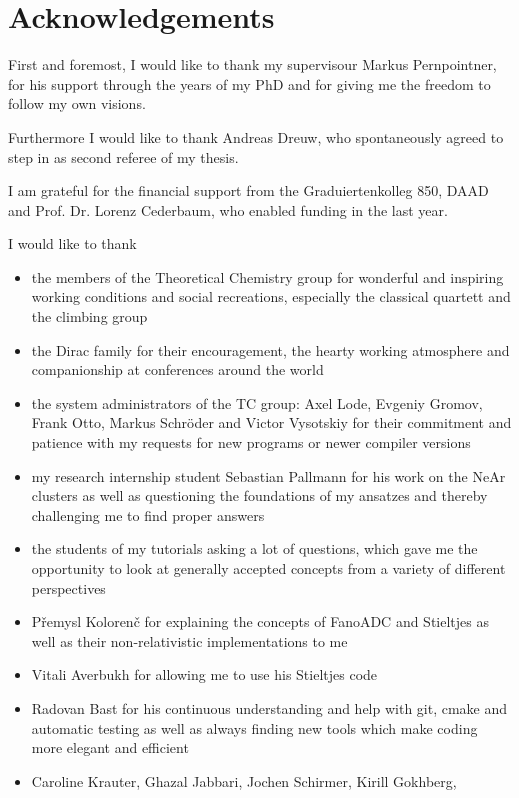 \chapter*{Acknowledgements}

First and foremost, I would like to thank my supervisour Markus Pernpointner,
for his support through the years of my PhD and for giving me the freedom to
follow my own visions.

Furthermore I would like to thank Andreas Dreuw, who spontaneously agreed to
step in as second referee of my thesis.

I am grateful for the financial support from the Graduiertenkolleg 850, DAAD
and Prof. Dr. Lorenz Cederbaum, who enabled funding in the last year.

I would like to thank
\begin{itemize}
 \item the members of the Theoretical Chemistry group for wonderful and
       inspiring working conditions and social recreations, especially
       the classical quartett and the climbing group
 \item the Dirac family for their encouragement, the hearty working
       atmosphere and companionship at conferences around the world
 \item the system administrators of the TC group:
       Axel Lode, Evgeniy Gromov, Frank Otto,
       Markus Schröder and Victor Vysotskiy for their commitment and patience
       with my requests for new programs or newer compiler versions
 \item my research internship student Sebastian Pallmann for his work
       on the NeAr clusters as well as questioning the foundations of my ansatzes
       and thereby challenging me to find proper answers
 \item the students of my tutorials asking a lot of questions, which gave
       me the opportunity to look at generally accepted concepts from
       a variety of different perspectives
 \item P\v{r}emysl Koloren\v{c} for explaining the concepts of FanoADC
       and Stieltjes as well as their non-relativistic implementations to me
 \item Vitali Averbukh for allowing me to use his Stieltjes code
 \item Radovan Bast for his continuous understanding and help with git,
       cmake and automatic testing as well as always finding 
       new tools which make coding more elegant and efficient
 \item Caroline Krauter, Ghazal Jabbari, Jochen Schirmer, Kirill Gokhberg,

\end{itemize}
